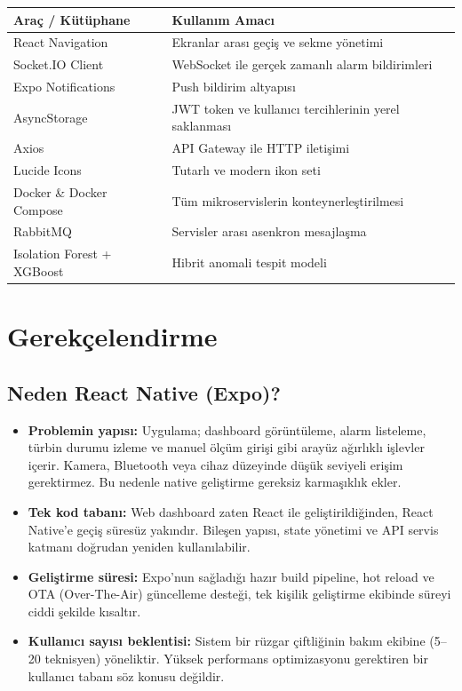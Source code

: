 \documentclass[12pt,a4paper]{article}
\begin{document}
\begin{table}[h]
\centering
\renewcommand{\arraystretch}{1.3}
\begin{tabularx}{\textwidth}{lX}
\toprule
\textbf{Ara\c{c} / K\"ut\"uphane} & \textbf{Kullan{\i}m Amac{\i}} \\
\midrule
React Navigation & Ekranlar aras{\i} ge\c{c}i\c{s} ve sekme y\"onetimi \\
Socket.IO Client & WebSocket ile ger\c{c}ek zamanl{\i} alarm bildirimleri \\
Expo Notifications & Push bildirim altyap{\i}s{\i} \\
AsyncStorage & JWT token ve kullan{\i}c{\i} tercihlerinin yerel saklanmas{\i} \\
Axios & API Gateway ile HTTP ileti\c{s}imi \\
Lucide Icons & Tutarl{\i} ve modern ikon seti \\
Docker \& Docker Compose & T\"um mikroservislerin konteynerle\c{s}tirilmesi \\
RabbitMQ & Servisler aras{\i} asenkron mesajla\c{s}ma \\
Isolation Forest + XGBoost & Hibrit anomali tespit modeli \\
\bottomrule
\end{tabularx}
\end{table}

\section{Gerek\c{c}elendirme}

\subsection{Neden React Native (Expo)?}

\begin{itemize}[leftmargin=1.5em, itemsep=0.3em]
    \item \textbf{Problemin yap{\i}s{\i}:} Uygulama; dashboard g\"or\"unt\"uleme, alarm listeleme, t\"urbin durumu izleme ve manuel \"ol\c{c}\"um giri\c{s}i gibi aray\"uz a\u{g}{\i}rl{\i}kl{\i} i\c{s}levler i\c{c}erir. Kamera, Bluetooth veya cihaz d\"uzeyinde d\"u\c{s}\"uk seviyeli eri\c{s}im gerektirmez. Bu nedenle native geli\c{s}tirme gereksiz karma\c{s}{\i}kl{\i}k ekler.
    \item \textbf{Tek kod taban{\i}:} Web dashboard zaten React ile geli\c{s}tirildi\u{g}inden, React Native'e ge\c{c}i\c{s} s\"ures\"uz yak{\i}nd{\i}r. Bile\c{s}en yap{\i}s{\i}, state y\"onetimi ve API servis katman{\i} do\u{g}rudan yeniden kullan{\i}labilir.
    \item \textbf{Geli\c{s}tirme s\"uresi:} Expo'nun sa\u{g}lad{\i}\u{g}{\i} haz{\i}r build pipeline, hot reload ve OTA (Over-The-Air) g\"uncelleme deste\u{g}i, tek ki\c{s}ilik geli\c{s}tirme ekibinde s\"ureyi ciddi \c{s}ekilde k{\i}salt{\i}r.
    \item \textbf{Kullan{\i}c{\i} say{\i}s{\i} beklentisi:} Sistem bir r\"uzgar \c{c}iftli\u{g}inin bak{\i}m ekibine (5--20 teknisyen) y\"oneliktir. Y\"uksek performans optimizasyonu gerektiren bir kullan{\i}c{\i} taban{\i} s\"oz konusu de\u{g}ildir.
\end{itemize}
\end{document}
